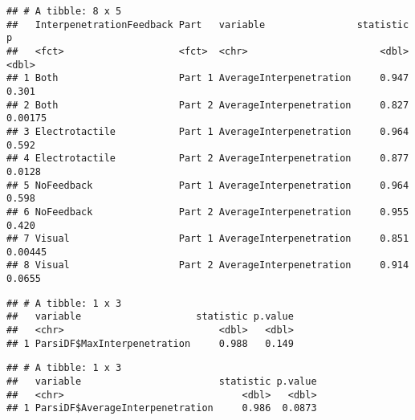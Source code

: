 \documentclass[
]{article}
\newenvironment{Shaded}{\begin{snugshade}}{\end{snugshade}}
\newcommand{\CommentTok}[1]{\textcolor[rgb]{0.56,0.35,0.01}{\textit{#1}}}
\newcommand{\KeywordTok}[1]{\textcolor[rgb]{0.13,0.29,0.53}{\textbf{#1}}}
\newcommand{\NormalTok}[1]{#1}
\newcommand{\OperatorTok}[1]{\textcolor[rgb]{0.81,0.36,0.00}{\textbf{#1}}}
\newcommand{\StringTok}[1]{\textcolor[rgb]{0.31,0.60,0.02}{#1}}
\begin{document}
\begin{verbatim}
## # A tibble: 8 x 5
##   InterpenetrationFeedback Part   variable                statistic       p
##   <fct>                    <fct>  <chr>                       <dbl>   <dbl>
## 1 Both                     Part 1 AverageInterpenetration     0.947 0.301  
## 2 Both                     Part 2 AverageInterpenetration     0.827 0.00175
## 3 Electrotactile           Part 1 AverageInterpenetration     0.964 0.592  
## 4 Electrotactile           Part 2 AverageInterpenetration     0.877 0.0128 
## 5 NoFeedback               Part 1 AverageInterpenetration     0.964 0.598  
## 6 NoFeedback               Part 2 AverageInterpenetration     0.955 0.420  
## 7 Visual                   Part 1 AverageInterpenetration     0.851 0.00445
## 8 Visual                   Part 2 AverageInterpenetration     0.914 0.0655
\end{verbatim}

\begin{Shaded}
\end{Shaded}

\begin{verbatim}
## # A tibble: 1 x 3
##   variable                    statistic p.value
##   <chr>                           <dbl>   <dbl>
## 1 ParsiDF$MaxInterpenetration     0.988   0.149
\end{verbatim}

\begin{Shaded}
\end{Shaded}

\begin{verbatim}
## # A tibble: 1 x 3
##   variable                        statistic p.value
##   <chr>                               <dbl>   <dbl>
## 1 ParsiDF$AverageInterpenetration     0.986  0.0873
\end{verbatim}
\end{document}
